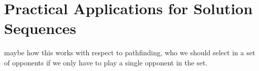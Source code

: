 \chapter{Practical Applications for Solution Sequences}\label{ch:applications}

maybe how this works with respect to pathfinding, who we should select in a set of opponents if we only have to play a single opponent in the set.  